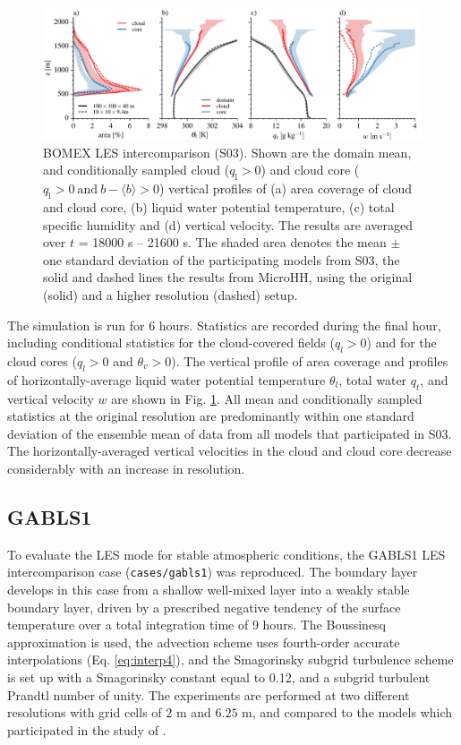 \documentclass[gmd,manuscript]{copernicus}
\begin{document}
\begin{figure}[t]
	\vspace*{2mm}
	\begin{center}
		\includegraphics[width=16.6cm]{figs/gmd_bomex_profs.pdf}
	\end{center}
	\caption{BOMEX LES intercomparison (S03). Shown are the domain mean, and conditionally sampled cloud ($q_\mathrm{l} > 0$) and cloud core ($q_\mathrm{l}>0 \ \mathrm{and} \ b-\langle b \rangle > 0$) vertical profiles of (a) area coverage of cloud and cloud core, (b) liquid water potential temperature, (c) total specific humidity and (d) vertical velocity. The results are averaged over $t$ = 18000 s -- 21600 s. The shaded area denotes the mean $\pm$ one standard deviation of the participating models from S03, the solid and dashed lines the results from MicroHH, using the original (solid) and a higher resolution (dashed) setup.}
	\label{fig:bomex}
\end{figure}

The simulation is run for 6 hours. Statistics are recorded during the final hour, including conditional statistics for the cloud-covered fields ($q_l > 0$) and for the cloud cores ($q_l > 0$ and $\theta_v > 0$). The vertical profile of area coverage and profiles of horizontally-average liquid water potential temperature $\theta_l$, total water $q_t$, and vertical velocity $w$ are shown in Fig. \ref{fig:bomex}. All mean and conditionally sampled statistics at the original resolution are predominantly within one standard deviation of the ensemble mean of data from all models that participated in S03. The horizontally-averaged vertical velocities in the cloud and cloud core decrease considerably with an increase in resolution.

\subsection{GABLS1}
To evaluate the LES mode for stable atmospheric conditions, the GABLS1 LES intercomparison case \citep{Beare2006} (\texttt{cases/gabls1}) was reproduced. The boundary layer develops in this case from a shallow well-mixed layer into a weakly stable boundary layer, driven by a prescribed negative tendency of the surface temperature over a total integration time of 9 hours. The Boussinesq approximation is used, the advection scheme uses fourth-order accurate interpolations (Eq. \ref{eq:interp4}), and the Smagorinsky subgrid turbulence scheme is set up with a Smagorinsky constant equal to 0.12, and a subgrid turbulent Prandtl number of unity. The experiments are performed at two different resolutions with grid cells of $2$ m and $6.25$ m, and compared to the models which participated in the study of \cite{Beare2006}. 
\end{document}
